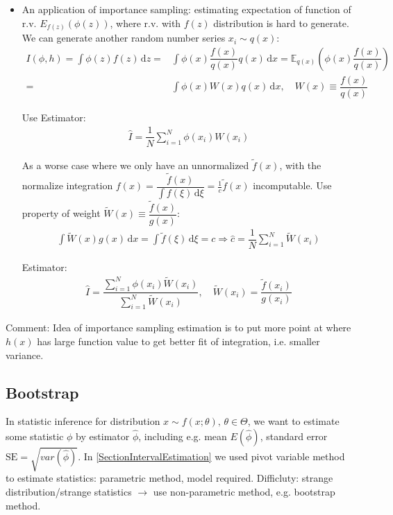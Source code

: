     \begin{itemize}[topsep=2pt,itemsep=0pt]
        \item An application of importance sampling: estimating expectation of function of r.v. $ E_{f(z)}\left(\phi(z)\right) $, where r.v. with $ f(z) $ distribution is hard to generate. We can generate another random number series $ x_i\sim q(x) $:
        \begin{align}
            I(\phi,h)=\int \phi(z)f(z) \,\mathrm{d}z =&\int \phi(x)\dfrac{f(x)}{q(x)}q(x) \,\mathrm{d}x=\mathbb{E}_{q(x)}\left(\phi(x)\dfrac{f(x)}{q(x)}\right)\\
            =&\int \phi(x)W(x)q(x) \,\mathrm{d}x,\quad W(x)\equiv\dfrac{f(x)}{q(x)}
        \end{align}
    
        Use Estimator:
        \begin{align}
            \hat{I}=\dfrac{1}{N}\sum_{i=1}^N\phi(x_i)W(x_i) 
        \end{align}

        As a worse case where we only have an unnormalized $ \tilde{f}(x) $, with the normalize integration $ f(x)=\dfrac{\tilde{f}(x)}{\int f(\xi ) \,\mathrm{d}\xi }=\frac{1}{c}\tilde{f}(x) $ incomputable. Use property of weight $ \tilde{W}(x)\equiv\dfrac{\tilde{f}(x)}{g(x)} $:
        \begin{align}
            \int \tilde{W}(x)g(x) \,\mathrm{d}x= \int \tilde{f}(\xi ) \,\mathrm{d}\xi=c \Rightarrow \hat{c}=\dfrac{1}{N}\sum_{i=1}^N\tilde{W}(x_i)
        \end{align}
        
        Estimator:
        \begin{align}
            \hat{I}=\dfrac{\sum_{i=1}^N\phi(x_i)\tilde{W}(x_i)}{\sum_{i=1}^N\tilde{W}(x_i)} ,\quad \tilde{W}(x_i)=\dfrac{\tilde{f}(x_i)}{g(x_i)}
        \end{align}
        
    \end{itemize}
    
        
    Comment: Idea of importance sampling estimation is to put more point at where $ h(x) $ has large function value to get better fit of integration, i.e. smaller variance.
    
\subsection{Bootstrap}
    In statistic inference for distribution $ x\sim f(x;\theta ) ,\,\theta \in \Theta $, we want to estimate some statistic $ \phi $ by estimator $ \hat{\phi } $, including e.g. mean $ E(\hat{\phi}) $, standard error $ \mathrm{SE}=\sqrt{var(\hat{\phi })}  $. In \autoref{SectionIntervalEstimation} we used pivot variable method to estimate statistics: parametric method, model required. Difficluty: strange distribution/strange statistics $ \to $ use non-parametric method, e.g. bootstrap method.
    
